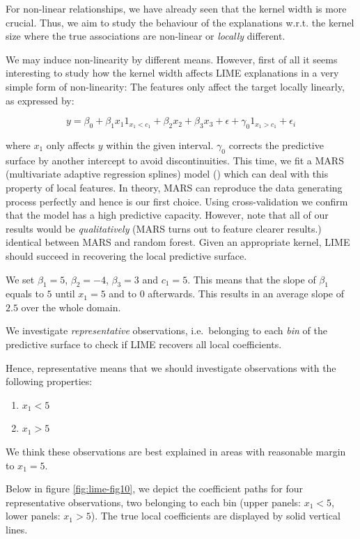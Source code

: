 \documentclass[]{krantz}
\begin{document}
For non-linear relationships, we have already seen that the kernel width
is more crucial. Thus, we aim to study the behaviour of the explanations
w.r.t. the kernel size where the true associations are non-linear or
\emph{locally} different.

We may induce non-linearity by different means. However, first of all it
seems interesting to study how the kernel width affects LIME
explanations in a very simple form of non-linearity: The features only
affect the target locally linearly, as expressed by:

\[ y = \beta_0 + \beta_1 x_1 1_{x_1<c_1} + \beta_2 x_2 + \beta_3 x_3 + \epsilon + \gamma_0 1_{x_1>c_1} + \epsilon_i\]

where \(x_1\) only affects \(y\) within the given interval. \(\gamma_0\)
corrects the predictive surface by another intercept to avoid
discontinuities. This time, we fit a MARS (multivariate adaptive
regression splines) model (\citet{friedman1991multivariate}) which can
deal with this property of local features. In theory, MARS can reproduce
the data generating process perfectly and hence is our first choice.
Using cross-validation we confirm that the model has a high predictive
capacity. However, note that all of our results would be
\emph{qualitatively} (MARS turns out to feature clearer results.)
identical between MARS and random forest. Given an appropriate kernel,
LIME should succeed in recovering the local predictive surface.

We set \(\beta_1 = 5\), \(\beta_2 = -4\), \(\beta_3 = 3\) and
\(c_1 = 5\). This means that the slope of \(\beta_1\) equals to \(5\)
until \(x_1 = 5\) and to \(0\) afterwards. This results in an average
slope of \(2.5\) over the whole domain.

We investigate \emph{representative} observations, i.e.~belonging to
each \emph{bin} of the predictive surface to check if LIME recovers all
local coefficients.

Hence, representative means that we should investigate observations with
the following properties:

\begin{enumerate}
\def\labelenumi{\arabic{enumi}.}
\item
  \(x_1 < 5\)
\item
  \(x_1 > 5\)
\end{enumerate}

We think these observations are best explained in areas with reasonable
margin to \(x_1 = 5\).

Below in figure \ref{fig:lime-fig10}, we depict the coefficient paths
for four representative observations, two belonging to each bin (upper
panels: \(x_1 < 5\), lower panels: \(x_1 > 5\)). The true local
coefficients are displayed by solid vertical lines.
\end{document}
